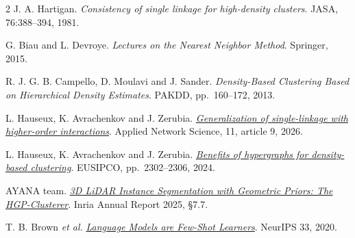 \begingroup
\fontsize{20}{22}\selectfont\color{inriagrayblue}
\setlength{\columnsep}{1.4cm}\setlength{\parskip}{0.10cm}
\vspace{-0.15cm}
\begin{multicols}{2}\RaggedRight
{} J. A. Hartigan. \emph{Consistency of single linkage for high-density clusters}. JASA, 76:388--394, 1981.\par
{} G. Biau and L. Devroye. \emph{Lectures on the Nearest Neighbor Method}. Springer, 2015.\par
{} R. J. G. B. Campello, D. Moulavi and J. Sander. \emph{Density-Based Clustering Based on Hierarchical Density Estimates}. PAKDD, pp.~160--172, 2013.\par
{} L. Hauseux, K. Avrachenkov and J. Zerubia. {\hypersetup{urlcolor=inriared}\href{https://doi.org/10.1007/s41109-025-00756-1}{\emph{Generalization of single-linkage with higher-order interactions}}}. Applied Network Science, 11, article 9, 2026.\par
\columnbreak
{} L. Hauseux, K. Avrachenkov and J. Zerubia. {\hypersetup{urlcolor=inriared}\href{https://doi.org/10.23919/EUSIPCO63174.2024.10715271}{\emph{Benefits of hypergraphs for density-based clustering}}}. EUSIPCO, pp.~2302--2306, 2024.\par
{} AYANA team. \href{https://radar.inria.fr/report/2025/ayana/index.html\#AYANA-RA-2025_label_NavalResult}{\emph{3D LiDAR Instance Segmentation with Geometric Priors: The HGP-Clusterer}}. Inria Annual Report 2025, \S7.7.\par
{} T. B. Brown \emph{et al.} \href{https://arxiv.org/abs/2005.14165}{\emph{Language Models are Few-Shot Learners}}. NeurIPS 33, 2020.\par
\end{multicols}
\endgroup
